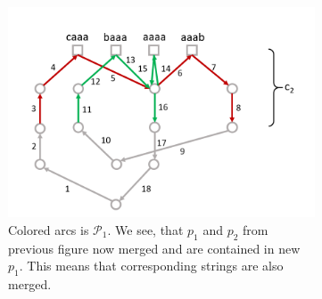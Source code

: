 \documentclass[11pt]{article}
\begin{document}
\begin{figure}[h]
\begin{subfigure}[t]{0.3\textwidth}
			\includegraphics[width=\textwidth]{gha_is_greedy_img/fig3.png}
			\caption{Colored arcs is $\mathcal{P}_1$. We see, that $p_1$ and $p_2$ from previous figure now merged and are contained in new $p_1$. This means that corresponding strings are also merged.}
			\label{fig:1c}
		\end{subfigure}
	\caption{}
	\end{figure}
	
\end{document}
